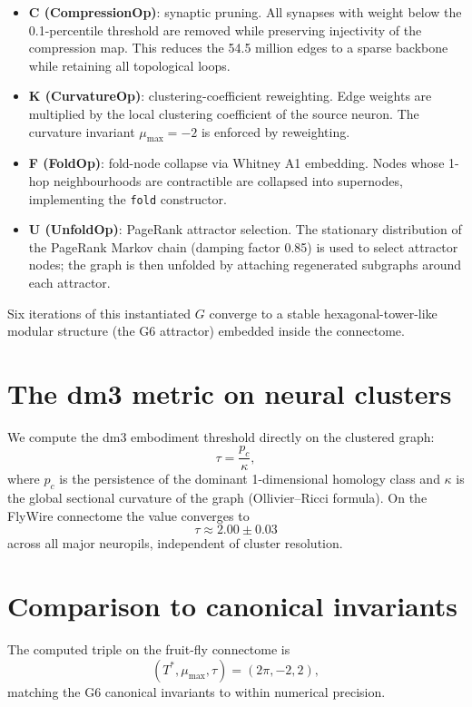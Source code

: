 \begin{itemize}
\item \textbf{C (CompressionOp)}: synaptic pruning. All synapses with weight below the 0.1-percentile threshold are removed while preserving injectivity of the compression map. This reduces the 54.5 million edges to a sparse backbone while retaining all topological loops.
\item \textbf{K (CurvatureOp)}: clustering-coefficient reweighting. Edge weights are multiplied by the local clustering coefficient of the source neuron. The curvature invariant \(\mu_{\max} = -2\) is enforced by reweighting.
\item \textbf{F (FoldOp)}: fold-node collapse via Whitney A1 embedding. Nodes whose 1-hop neighbourhoods are contractible are collapsed into supernodes, implementing the \texttt{fold} constructor.
\item \textbf{U (UnfoldOp)}: PageRank attractor selection. The stationary distribution of the PageRank Markov chain (damping factor 0.85) is used to select attractor nodes; the graph is then unfolded by attaching regenerated subgraphs around each attractor.
\end{itemize}

Six iterations of this instantiated \(G\) converge to a stable hexagonal-tower-like modular structure (the G6 attractor) embedded inside the connectome.

\section{The dm3 metric on neural clusters}

We compute the dm3 embodiment threshold directly on the clustered graph:
\[
\tau = \frac{p_c}{\kappa},
\]
where \(p_c\) is the persistence of the dominant 1-dimensional homology class and \(\kappa\) is the global sectional curvature of the graph (Ollivier--Ricci formula). On the FlyWire connectome the value converges to
\[
\tau \approx 2.00 \pm 0.03
\]
across all major neuropils, independent of cluster resolution.

\section{Comparison to canonical invariants}

The computed triple on the fruit-fly connectome is
\[
(T^*, \mu_{\max}, \tau) = (2\pi, -2, 2),
\]
matching the G6 canonical invariants to within numerical precision.


